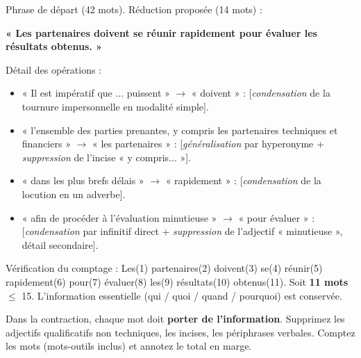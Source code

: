 \documentclass[11pt]{article}
\begin{document}
\begin{corrige}
Phrase de départ (42 mots). Réduction proposée (14 mots) :

\begin{center}
\textbf{« Les partenaires doivent se réunir rapidement pour évaluer les résultats obtenus. »}
\end{center}

Détail des opérations :
\begin{itemize}
    \item « Il est impératif que ... puissent » $\rightarrow$ « doivent » : [\emph{condensation} de la tournure impersonnelle en modalité simple].
    \item « l'ensemble des parties prenantes, y compris les partenaires techniques et financiers » $\rightarrow$ « les partenaires » : [\emph{généralisation} par hyperonyme + \emph{suppression} de l'incise « y compris... »].
    \item « dans les plus brefs délais » $\rightarrow$ « rapidement » : [\emph{condensation} de la locution en un adverbe].
    \item « afin de procéder à l'évaluation minutieuse » $\rightarrow$ « pour évaluer » : [\emph{condensation} par infinitif direct + \emph{suppression} de l'adjectif « minutieuse », détail secondaire].
\end{itemize}

Vérification du comptage : Les(1) partenaires(2) doivent(3) se(4) réunir(5) rapidement(6) pour(7) évaluer(8) les(9) résultats(10) obtenus(11). Soit \textbf{11 mots} $\leq$ 15. L'information essentielle (qui / quoi / quand / pourquoi) est conservée.
\end{corrige}

\begin{attention}
Dans la contraction, chaque mot doit \textbf{porter de l'information}. Supprimez les adjectifs qualificatifs non techniques, les incises, les périphrases verbales. Comptez les mots (mots-outils inclus) et annotez le total en marge.
\end{attention}
\end{document}
